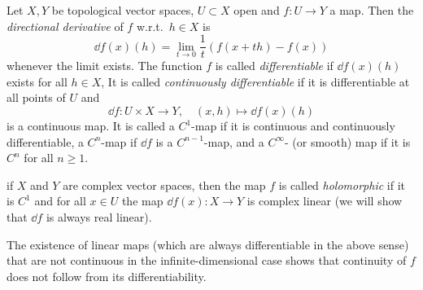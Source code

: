 \begin{defn}
    Let $X,Y$ be topological vector spaces, $U\subset X$ open and $f:U\to Y$ a map. Then the \emph{directional derivative} of $f$ w.r.t.\ $h\in X$ is
    \[\dd f(x)(h)=\lim_{t\to 0}\frac{1}{t}\left(f(x+th)-f(x)\right)\]
    whenever the limit exists. The function $f$ is called \emph{differentiable} if $\dd f(x)(h)$ exists for all $h\in X$, It is called \emph{continuously differentiable} if it is differentiable at all points of $U$ and 
    \[\dd f:U\times X\to Y,\quad (x,h)\mapsto \dd f(x)(h)\]
    is a continuous map. It is called a $C^1$-map if it is continuous and continuously differentiable, a $C^n$-map if $\dd f$ is a $C^{n-1}$-map, and a $C^\infty$- (or smooth) map if it is $C^n$ for all $n\geq 1$.

    if $X$ and $Y$ are complex vector spaces, then the map $f$ is called \emph{holomorphic} if it is $C^1$ and for all $x\in U$ the map $\dd f(x):X\to Y$ is complex linear (we will show that $\dd f$ is always real linear).
\end{defn}
\begin{rem}
    The existence of linear maps (which are always differentiable in the above sense) that are not continuous in the infinite-dimensional case shows that continuity of $f$ does not follow from its differentiability.
\end{rem}

